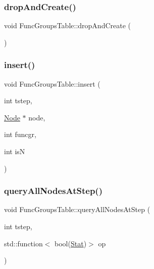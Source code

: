 \mbox{\label{class_func_groups_table_a6fb0da3510cb7b4d9fb2760fcf447fe6}} 
\subsubsection{\texorpdfstring{dropAndCreate()}{dropAndCreate()}}
{\footnotesize\ttfamily void Func\+Groups\+Table\+::drop\+And\+Create (\begin{DoxyParamCaption}{ }\end{DoxyParamCaption})}

\mbox{\label{class_func_groups_table_a2d391967ca9afb238e2ccac7a91e0a8e}} 
\subsubsection{\texorpdfstring{insert()}{insert()}}
{\footnotesize\ttfamily void Func\+Groups\+Table\+::insert (\begin{DoxyParamCaption}\item[{int}]{tstep,  }\item[{\mbox{\hyperlink{class_node}{Node}} $\ast$}]{node,  }\item[{int}]{funcgr,  }\item[{int}]{isN }\end{DoxyParamCaption})}

\mbox{\label{class_func_groups_table_a5426216ba3d2f42055c29ee7ae7cbe6a}} 
\subsubsection{\texorpdfstring{queryAllNodesAtStep()}{queryAllNodesAtStep()}}
{\footnotesize\ttfamily void Func\+Groups\+Table\+::query\+All\+Nodes\+At\+Step (\begin{DoxyParamCaption}\item[{int}]{tstep,  }\item[{std\+::function$<$ bool(\mbox{\hyperlink{struct_func_groups_table_1_1_stat}{Stat}})$>$}]{op }\end{DoxyParamCaption})}



